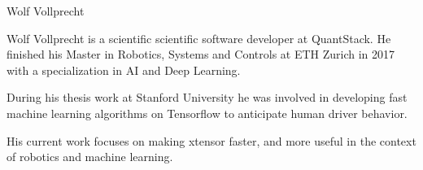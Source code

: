 \begin{participant}[type=R,PM=0,gender=male]{Wolf Vollprecht}


  Wolf Vollprecht is a scientific scientific software developer at QuantStack. He finished his Master in Robotics, Systems and Controls at ETH Zurich in 2017 with a specialization in AI and Deep Learning.

  During his thesis work at Stanford University he was involved in developing fast machine learning algorithms on Tensorflow to anticipate human driver behavior.

  His current work focuses on making xtensor faster, and more useful in the context of robotics and machine learning.

\end{participant}

